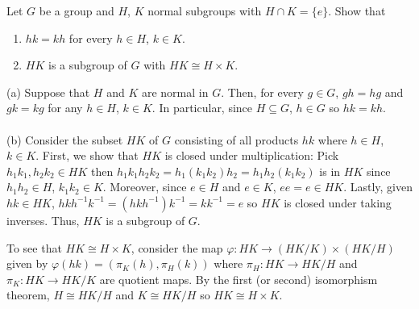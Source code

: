 \begin{problem}
  Let \(G\) be a group and \(H\), \(K\) normal subgroups with
  \(H\cap K=\{e\}\). Show that
  \begin{enumerate}[label=(\alph*)]
  \item \(hk=kh\) for every \(h\in H\), \(k\in K\).
  \item \(HK\) is a subgroup of \(G\) with \(HK\cong H\times K\).
  \end{enumerate}
\end{problem}
\begin{solution}
  (a) Suppose that \(H\) and \(K\) are normal in \(G\). Then, for every
  \(g\in G\), \(gh=hg\) and \(gk=kg\) for any \(h\in H\), \(k\in K\). In
  particular, since \(H\subseteq G\), \(h\in G\) so \(hk=kh\).
  \\\\
  (b) Consider the subset \(HK\) of \(G\) consisting of all products \(hk\)
  where \(h\in H\), \(k\in K\). First, we show that \(HK\) is closed under
  multiplication: Pick \(h_1k_1,h_2k_2\in HK\) then
  \(h_1k_1h_2k_2=h_1(k_1k_2)h_2=h_1h_2(k_1k_2)\) is in \(HK\) since
  \(h_1h_2\in H\), \(k_1k_2\in K\). Moreover, since \(e\in H\) and
  \(e\in K\), \(ee=e\in HK\). Lastly, given \(hk\in HK\),
  \(hkh^{-1}k^{-1}=(hkh^{-1})k^{-1}=kk^{-1}=e\) so \(HK\) is closed under
  taking inverses. Thus, \(HK\) is a subgroup of \(G\).

  To see that \(HK\cong H\times K\), consider the map
  \(\varphi\colon HK\to (HK/K)\times(HK/H)\) given by
  \(\varphi(hk)=(\pi_K(h),\pi_H(k))\) where \(\pi_H\colon HK\to HK/H\) and
  \(\pi_K\colon HK\to HK/K\) are quotient maps. By the first (or second)
  isomorphism theorem, \(H\cong HK/H\) and \(K\cong HK/H\) so
  \(HK\cong H\times K\).
\end{solution}

